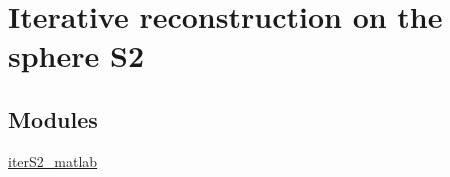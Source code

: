 \hypertarget{group__applications__iterS2}{
\section{Iterative reconstruction on the sphere S2}
\label{group__applications__iterS2}
}
\subsection*{Modules}
\begin{CompactItemize}
\item 
\hyperlink{group__applications__iterS2__matlab}{iterS2\_\-matlab}
\end{CompactItemize}
